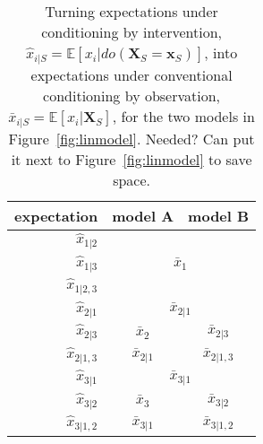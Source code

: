 \documentclass{article}
\newcommand{\vX}{\mathbf{X}}
\newcommand{\vx}{\mathbf{x}}
\newcommand{\expectation}{\mathbb{E}}
\newcommand{\dodo}{\mathit{do}}
\newcommand{\lvdo}[1]{\dodo(\vX_{#1} = \vx_{#1})}
\newcommand{\bx}{\bar{x}}
\newcommand{\hx}{\hat{x}}
\newcommand{\comment}[1]{{\color{red} #1}}
\begin{document}
\begin{table}
	\begin{center}
		\begin{tabular}{r|cc} \toprule
			expectation & model A & model B \\ \midrule
			$\hx_{1|2}$ & \multicolumn{2}{c}{\multirow{3}{*}{$\bx_1$}} \\
			$\hx_{1|3}$ & \multicolumn{2}{c}{} \\
			$\hx_{1|2,3}$ & \multicolumn{2}{c}{} \\ \midrule
			$\hx_{2|1}$ & \multicolumn{2}{c}{$\bx_{2|1}$} \\
			$\hx_{2|3}$ & $\bx_{2}$ & $\bx_{2|3}$ \\
			$\hx_{2|1,3}$ & $\bx_{2|1}$ & $\bx_{2|1,3}$ \\ \midrule
			$\hx_{3|1}$ & \multicolumn{2}{c}{$\bx_{3|1}$} \\
			$\hx_{3|2}$ & $\bx_{3}$ & $\bx_{3|2}$ \\
			$\hx_{3|1,2}$ & $\bx_{3|1}$ & $\bx_{3|1,2}$ \\ \bottomrule
		\end{tabular}
	\end{center}
	\caption{Turning expectations under conditioning by intervention, $\hx_{i|S} = \expectation[x_i|\lvdo{S}]$, into expectations under conventional conditioning by observation, $\bx_{i|S} = \expectation[x_i|\vX_S]$, for the two models in Figure~\ref{fig:linmodel}. \comment{Needed? Can put it next to Figure~\ref{fig:linmodel} to save space.}}
	\label{tab:rewriting}
\end{table}
\end{document}
